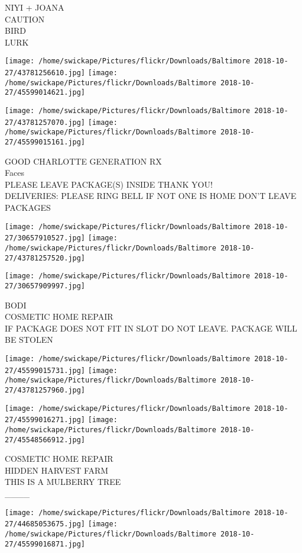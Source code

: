 \documentclass[10pt,letterpaper]{article}
\begin{document}
NIYI + JOANA\\
CAUTION\\
BIRD\\
LURK
\pagebreak

\texttt{[image: /home/swickape/Pictures/flickr/Downloads/Baltimore 2018-10-27/43781256610.jpg]}
\texttt{[image: /home/swickape/Pictures/flickr/Downloads/Baltimore 2018-10-27/45599014621.jpg]}

\texttt{[image: /home/swickape/Pictures/flickr/Downloads/Baltimore 2018-10-27/43781257070.jpg]}
\texttt{[image: /home/swickape/Pictures/flickr/Downloads/Baltimore 2018-10-27/45599015161.jpg]}

GOOD CHARLOTTE GENERATION RX\\
Faces\\
PLEASE LEAVE PACKAGE(S) INSIDE THANK YOU!\\
DELIVERIES: PLEASE RING BELL IF NOT ONE IS HOME DON'T LEAVE PACKAGES
\pagebreak

\texttt{[image: /home/swickape/Pictures/flickr/Downloads/Baltimore 2018-10-27/30657910527.jpg]}
\texttt{[image: /home/swickape/Pictures/flickr/Downloads/Baltimore 2018-10-27/43781257520.jpg]}

\vspace{0.25in}
\texttt{[image: /home/swickape/Pictures/flickr/Downloads/Baltimore 2018-10-27/30657909997.jpg]}

BODI\\
COSMETIC HOME REPAIR\\
IF PACKAGE DOES NOT FIT IN SLOT DO NOT LEAVE.  PACKAGE WILL BE STOLEN
\pagebreak

\texttt{[image: /home/swickape/Pictures/flickr/Downloads/Baltimore 2018-10-27/45599015731.jpg]}
\texttt{[image: /home/swickape/Pictures/flickr/Downloads/Baltimore 2018-10-27/43781257960.jpg]}

\texttt{[image: /home/swickape/Pictures/flickr/Downloads/Baltimore 2018-10-27/45599016271.jpg]}
\texttt{[image: /home/swickape/Pictures/flickr/Downloads/Baltimore 2018-10-27/45548566912.jpg]}

COSMETIC HOME REPAIR\\
HIDDEN HARVEST FARM\\
THIS IS A MULBERRY TREE\\
\_\_\_\_
\pagebreak

\texttt{[image: /home/swickape/Pictures/flickr/Downloads/Baltimore 2018-10-27/44685053675.jpg]}
\texttt{[image: /home/swickape/Pictures/flickr/Downloads/Baltimore 2018-10-27/45599016871.jpg]}
\end{document}
